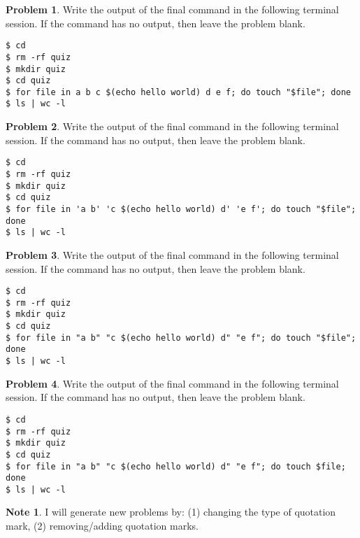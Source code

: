 \documentclass[10pt]{article}
\theoremstyle{definition}
\newtheorem{problem}{Problem}
\newtheorem{note}{Note}
\begin{document}
\begin{problem}
    Write the output of the final command in the following terminal session.
    If the command has no output, then leave the problem blank.
\end{problem}
\begin{lstlisting}
$ cd
$ rm -rf quiz
$ mkdir quiz
$ cd quiz
$ for file in a b c $(echo hello world) d e f; do touch "$file"; done
$ ls | wc -l
\end{lstlisting}
\vspace{0.4in}


\begin{problem}
    Write the output of the final command in the following terminal session.
    If the command has no output, then leave the problem blank.
\end{problem}
\begin{lstlisting}
$ cd
$ rm -rf quiz
$ mkdir quiz
$ cd quiz
$ for file in 'a b' 'c $(echo hello world) d' 'e f'; do touch "$file"; done
$ ls | wc -l
\end{lstlisting}
\vspace{0.4in}

\newpage
\begin{problem}
    Write the output of the final command in the following terminal session.
    If the command has no output, then leave the problem blank.
\end{problem}
\begin{lstlisting}
$ cd
$ rm -rf quiz
$ mkdir quiz
$ cd quiz
$ for file in "a b" "c $(echo hello world) d" "e f"; do touch "$file"; done
$ ls | wc -l
\end{lstlisting}
\vspace{0.4in}

\begin{problem}
    Write the output of the final command in the following terminal session.
    If the command has no output, then leave the problem blank.
\end{problem}
\begin{lstlisting}
$ cd
$ rm -rf quiz
$ mkdir quiz
$ cd quiz
$ for file in "a b" "c $(echo hello world) d" "e f"; do touch $file; done
$ ls | wc -l
\end{lstlisting}
\vspace{0.4in}

\begin{note}
    I will generate new problems by:
    (1) changing the type of quotation mark,
    (2) removing/adding quotation marks.
\end{note}
\end{document}
